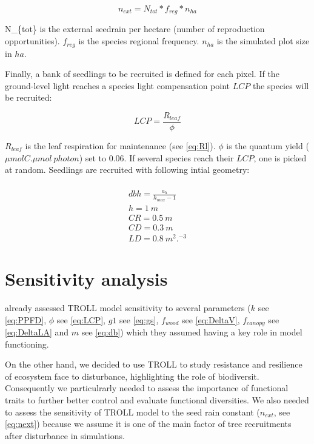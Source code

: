 \documentclass[]{article}
\theoremstyle{definition}
\theoremstyle{definition}
\theoremstyle{remark}
\begin{document}
\begin{equation}
  n_{ext} = N_{tot}*f_{reg}*n_{ha}
  \label{eq:next}
\end{equation}

N\_\{tot\} is the external seedrain per hectare (number of reproduction
opportunities). \(f_{reg}\) is the species regional frequency.
\(n_{ha}\) is the simulated plot size in \(ha\).

Finally, a bank of seedlings to be recruited is defined for each pixel.
If the ground-level light reaches a species light compensation point
\(LCP\) the species will be recruited:

\begin{equation}
  LCP = \frac{R_{leaf}}{\phi}
  \label{eq:LCP}
\end{equation}

\(R_{leaf}\) is the leaf respiration for maintenance (see \eqref{eq:Rl}).
\(\phi\) is the quantum yield (\(\mu mol C.\mu mol~photon\)) set to
0.06. If several species reach their \(LCP\), one is picked at random.
Seedlings are recruited with following intial geometry:

\begin{equation}
  \begin{array}{c} \\
    dbh = \frac{a_h}{h_{max} - 1}\\
    h = 1~m\\
    CR = 0.5~m\\
    CD = 0.3~m\\
    LD = 0.8~m^2.^{-3}
  \end{array}
  \label{eq:C}
\end{equation}

\section{Sensitivity analysis}\label{sensitivity-analysis}

\citet{Li} already assessed TROLL model sensitivity to several
parameters (\(k\) see \eqref{eq:PPFD}, \(\phi\) see \eqref{eq:LCP}, \(g1\)
see \eqref{eq:gs}, \(f_{wood}\) see \eqref{eq:DeltaV}, \(f_{canopy}\) see
\eqref{eq:DeltaLA} and \(m\) see \eqref{eq:db}) which they assumed having a
key role in model functioning.

On the other hand, we decided to use TROLL to study resistance and
resilience of ecosystem face to disturbance, highlighting the role of
biodiversit. Consequently we particulrarly needed to assess the
importance of functional traits to further better control and evaluate
functional diversities. We also needed to assess the sensitivity of
TROLL model to the seed rain constant (\(n_{ext}\), see \eqref{eq:next})
because we assume it is one of the main factor of tree recruitments
after disturbance in simulations.
\end{document}

